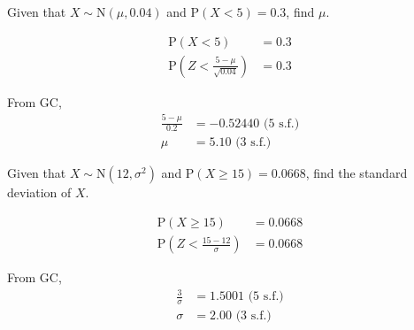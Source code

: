 \documentclass[11pt,a4paper]{book}
\begin{document}
\begin{example}

Given that $X\sim\text{N}\left(\mu,0.04\right)$ and $\text{P}\left(X<5\right)=0.3$,
find $\mu$.

\Solution

\begin{align*}
\text{P}\left(X<5\right) & =0.3\\
\text{P}\left(Z<\frac{5-\mu}{\sqrt{0.04}}\right) & =0.3
\end{align*}

From GC,
\begin{align*}
\frac{5-\mu}{0.2} & =-0.52440\text{ (5 s.f.)}\\
\mu & =5.10\text{ (3 s.f.)}
\end{align*}

\end{example}

\begin{example}

Given that $X\sim\text{N}\left(12,\sigma^{2}\right)$ and $\text{P}\left(X\geq15\right)=0.0668$,
find the standard deviation of $X$.

\Solution

\begin{align*}
\text{P}\left(X\geq15\right) & =0.0668\\
\text{P}\left(Z<\frac{15-12}{\sigma}\right) & =0.0668
\end{align*}

From GC,
\begin{align*}
\frac{3}{\sigma} & =1.5001\text{ (5 s.f.)}\\
\sigma & =2.00\text{ (3 s.f.)}
\end{align*}

\end{example}

\newpage
\end{document}
